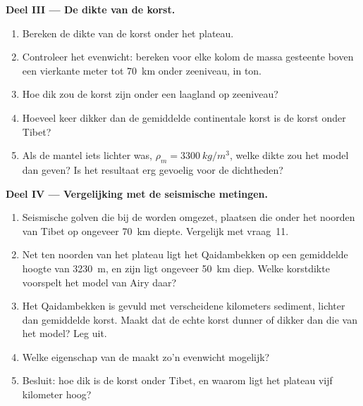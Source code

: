 \begin{problem}
\medskip
\noindent\textbf{Deel III --- De dikte van de korst.}
\begin{enumerate}[resume]
  \item Bereken de dikte van de korst onder het plateau.
  \item Controleer het evenwicht: bereken voor elke kolom de massa gesteente boven
        een vierkante meter tot \qty{70}{km} onder zeeniveau, in ton.
  \item Hoe dik zou de korst zijn onder een laagland op zeeniveau?
  \item Hoeveel keer dikker dan de gemiddelde continentale korst is de korst
        onder Tibet?
  \item Als de mantel iets lichter was, $\rho_m = \qty{3300}{kg/m^3}$, welke
        dikte zou het model dan geven? Is het resultaat erg gevoelig voor de
        dichtheden?
\end{enumerate}

\medskip
\noindent\textbf{Deel IV --- Vergelijking met de seismische metingen.}
\begin{enumerate}[resume]
  \item Seismische golven die bij de  worden omgezet, plaatsen die onder het
        noorden van Tibet op ongeveer \qty{70}{km} diepte. Vergelijk met vraag~11.
  \item Net ten noorden van het plateau ligt het Qaidambekken op een gemiddelde
        hoogte van \qty{3230}{m}, en zijn  ligt ongeveer \qty{50}{km}
        diep. Welke korstdikte voorspelt het model van Airy daar?
  \item Het Qaidambekken is gevuld met verscheidene kilometers sediment, lichter
        dan gemiddelde korst. Maakt dat de echte korst dunner of dikker dan die van
        het model? Leg uit.
  \item Welke eigenschap van de  maakt zo'n evenwicht mogelijk?
  \item Besluit: hoe dik is de korst onder Tibet, en waarom ligt het plateau vijf
        kilometer hoog?
\end{enumerate}
\end{problem}
